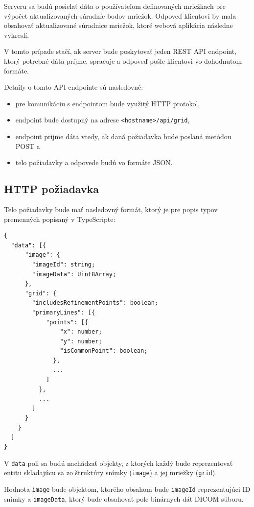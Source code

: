 Serveru sa budú posielať dáta o používateľom definovaných mriežkach pre výpočet aktualizovaných súradníc bodov mriežok. Odpoveď klientovi by mala obsahovať aktualizované súradnice mriežok, ktoré webová aplikácia následne vykreslí.

V tomto prípade stačí, ak server bude poskytovať jeden REST API endpoint, ktorý potrebné dáta príjme, spracuje a odpoveď pošle klientovi vo dohodnutom formáte.

Detaily o tomto API endpointe sú nasledovné:
\begin {itemize}
\item {pre komunikáciu s endpointom bude využitý HTTP protokol,}
\item {endpoint bude dostupný na adrese \texttt{<hostname>/api/grid},}
\item {endpoint prijme dáta vtedy, ak daná požiadavka bude poslaná metódou POST a}
\item {telo požiadavky a odpovede budú vo formáte JSON.}
\end {itemize}

\subsection {HTTP požiadavka}\label{http_request}

Telo požiadavky bude mať nasledovný formát, ktorý je pre popis typov premenných popísaný v TypeScripte:

\begin{minipage}[]{\linewidth}
\begin{verbatim}
{
  "data": [{
      "image": {
        "imageId": string;
        "imageData": Uint8Array;
      },
      "grid": {
        "includesRefinementPoints": boolean;
        "primaryLines": [{
            "points": [{
                "x": number;
                "y": number;
                "isCommonPoint": boolean;
              },
              ...
            ]
          },
          ...
        ]
      }
    }
  ]
}
\end{verbatim}
\end{minipage}

V \texttt{data} poli sa budú nachádzať objekty, z ktorých každý bude reprezentovať entitu skladajúcu sa zo štruktúry snímky (\texttt{image}) a jej mriežky (\texttt{grid}).

Hodnota \texttt{image} bude objektom, ktorého obsahom bude \texttt{imageId} reprezentujúci ID snímky a \texttt{imageData}, ktorý bude obsahovať pole binárnych dát DICOM súboru.

